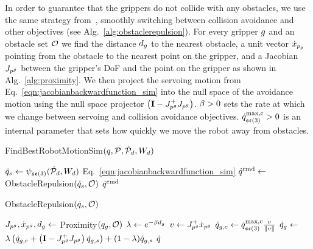 In order to guarantee that the grippers do not collide with any obstacles, we use the same strategy from~\cite{Berenson2013}, smoothly switching between collision avoidance and other objectives (see Alg.~\ref{alg:obstaclerepulsion}). For every gripper $g$ and an obstacle set $\mathcal{O}$ we find the distance $d_g$ to the nearest obstacle, a unit vector $\dot x_{p_g}$ pointing from the obstacle to the nearest point on the gripper, and a Jacobian $J_{p^g}$ between the gripper's DoF and the point on the gripper as shown in Alg.~\ref{alg:proximity}. We then project the servoing motion from Eq.~\eqref{eqn:jacobianbackwardfunction_sim} into the null space of the avoidance motion using the null space projector $\left(\mathbf{I} - J_{p^g}^+ J_{p^g} \right)$. $\beta > 0$ sets the rate at which we change between servoing and collision avoidance objectives. $\dot{q}^\textrm{max,c}_{\mathfrak{se}(3)} > 0$ is an internal parameter that sets how quickly we move the robot away from obstacles.

\begin{algorithm}[h]
\caption{FindBestRobotMotionSim$(q, \mathcal{P}, \dot{\mathcal{P}}_d, W_d)$}
\label{alg:find_best_robot_motion_simulation}
\begin{algorithmic}[1]
    \State $\dot{q}_{s} \gets \psi_{\mathfrak{se}(3)} (\dot{\mathcal{P}}_d, W_d)$ \hfill Eq.~\eqref{eqn:jacobianbackwardfunction_sim}
    \State $\dot{q}^\textrm{cmd} \gets $ ObstacleRepulsion$(\dot{q}_{s}, \mathcal{O})$
    \State \Return $\dot{q}^\textrm{cmd}$
\end{algorithmic}
\end{algorithm}

\begin{algorithm}[h]
\caption{ObstacleRepulsion$(\dot{q}_{s}, \mathcal{O})$}
\begin{algorithmic}[1]
        \State $J_{p^g}, \dot x _{p^g}, d_g \gets$ Proximity$(q_g, \mathcal{O})$
        \State $\lambda \gets e^{-\beta d_g}$
        \State $v \gets J_{p^g}^+ \dot x_{p^g}$
        \State $\dot{q}_{g, c} \gets \dot{q}^\textrm{max,c}_{\mathfrak{se}(3)} \frac{v}{\| v \|}$
        \State $\dot{q}_g \gets$ $\lambda \left( \dot{q}_{g, c} + \left( \mathbf{I} - J_{p^g}^+ J_{p^g} \right) \dot{q}_{g,s} \right) + (1-\lambda) \dot{q}_{g,s}$
    \EndFor        
    \State \Return $\dot{q}$
\end{algorithmic}
\label{alg:obstaclerepulsion}
\end{algorithm}

